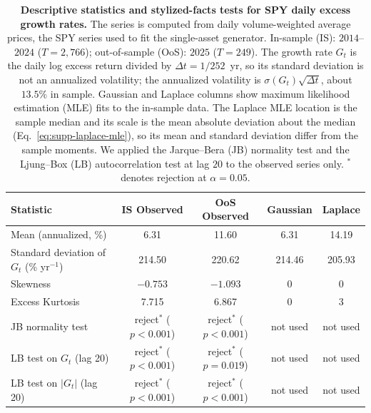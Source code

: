 \begin{table}[H]
\centering
\caption{\textbf{Descriptive statistics and stylized-facts tests for
    SPY daily excess growth rates.} The series is computed from daily
    volume-weighted average prices, the SPY series used to fit the
    single-asset generator. In-sample (IS): $2014$--$2024$
    ($T = 2{,}766$); out-of-sample (OoS): $2025$ ($T = 249$). The
    growth rate $G_t$ is the daily log excess return divided by
    $\Delta t = 1/252$~yr, so its standard deviation is not an
    annualized volatility; the annualized volatility is
    $\sigma(G_t)\sqrt{\Delta t}$, about $13.5\%$ in sample.
    Gaussian and Laplace columns show maximum likelihood estimation
    (MLE) fits to the in-sample data. The Laplace MLE location is the
    sample median and its scale is the mean absolute deviation about
    the median (Eq.~\eqref{eq:supp-laplace-mle}), so its mean and
    standard deviation differ from the sample moments. We applied the
    Jarque--Bera (JB) normality test and the Ljung--Box (LB)
    autocorrelation test at lag $20$ to the observed series only.
    $^{\ast}$ denotes rejection at $\alpha = 0.05$.}
\label{tab:descriptive_stats}
\small
\begin{tabular}{@{}lcccc@{}}
\toprule
\textbf{Statistic} & \textbf{IS Observed} & \textbf{OoS Observed} & \textbf{Gaussian} & \textbf{Laplace} \\ \midrule
Mean (annualized, \%)       & 6.31   & 11.60  & 6.31   & 14.19  \\
Standard deviation of $G_t$ (\% yr$^{-1}$) & 214.50 & 220.62 & 214.46 & 205.93 \\
Skewness                    & $-0.753$ & $-1.093$ & 0    & 0      \\
Excess Kurtosis             & 7.715  & 6.867  & 0      & 3      \\
JB normality test           & reject$^\ast$ ($p<0.001$) & reject$^\ast$ ($p<0.001$) & not used & not used \\
LB test on $G_t$ (lag 20)   & reject$^\ast$ ($p<0.001$) & reject$^\ast$ ($p=0.019$) & not used & not used \\
LB test on $|G_t|$ (lag 20) & reject$^\ast$ ($p<0.001$) & reject$^\ast$ ($p<0.001$) & not used & not used \\
\bottomrule
\end{tabular}
\end{table}

